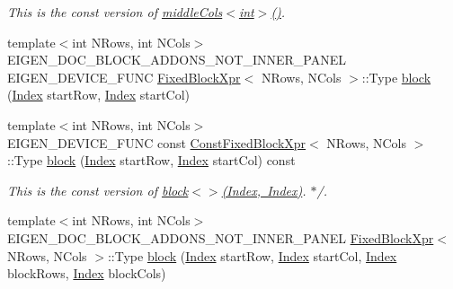 \begin{DoxyCompactItemize}
\begin{DoxyCompactList}\small\item\em This is the const version of \mbox{\hyperlink{class_eigen_1_1_sparse_matrix_base_a8a36ee6b1a072f07bfaaffd69cf31dbd}{middle\+Cols$<$int$>$()}}. \end{DoxyCompactList}\item 
{\footnotesize template$<$int N\+Rows, int N\+Cols$>$ }\\E\+I\+G\+E\+N\+\_\+\+D\+O\+C\+\_\+\+B\+L\+O\+C\+K\+\_\+\+A\+D\+D\+O\+N\+S\+\_\+\+N\+O\+T\+\_\+\+I\+N\+N\+E\+R\+\_\+\+P\+A\+N\+EL E\+I\+G\+E\+N\+\_\+\+D\+E\+V\+I\+C\+E\+\_\+\+F\+U\+NC \mbox{\hyperlink{struct_eigen_1_1_sparse_matrix_base_1_1_fixed_block_xpr}{Fixed\+Block\+Xpr}}$<$ N\+Rows, N\+Cols $>$\+::Type \mbox{\hyperlink{class_eigen_1_1_sparse_matrix_base_ad7a342adc59c2866c323ace6d2f65378}{block}} (\mbox{\hyperlink{struct_eigen_1_1_eigen_base_a554f30542cc2316add4b1ea0a492ff02}{Index}} start\+Row, \mbox{\hyperlink{struct_eigen_1_1_eigen_base_a554f30542cc2316add4b1ea0a492ff02}{Index}} start\+Col)
\item 
\mbox{\label{class_eigen_1_1_sparse_matrix_base_aba087af967b57fe36d38ba5029274630}} 
{\footnotesize template$<$int N\+Rows, int N\+Cols$>$ }\\E\+I\+G\+E\+N\+\_\+\+D\+E\+V\+I\+C\+E\+\_\+\+F\+U\+NC const \mbox{\hyperlink{struct_eigen_1_1_sparse_matrix_base_1_1_const_fixed_block_xpr}{Const\+Fixed\+Block\+Xpr}}$<$ N\+Rows, N\+Cols $>$\+::Type \mbox{\hyperlink{class_eigen_1_1_sparse_matrix_base_aba087af967b57fe36d38ba5029274630}{block}} (\mbox{\hyperlink{struct_eigen_1_1_eigen_base_a554f30542cc2316add4b1ea0a492ff02}{Index}} start\+Row, \mbox{\hyperlink{struct_eigen_1_1_eigen_base_a554f30542cc2316add4b1ea0a492ff02}{Index}} start\+Col) const
\begin{DoxyCompactList}\small\item\em This is the const version of \mbox{\hyperlink{class_eigen_1_1_sparse_matrix_base_ad7a342adc59c2866c323ace6d2f65378}{block$<$$>$(\+Index, Index)}}. $\ast$/. \end{DoxyCompactList}\item 
{\footnotesize template$<$int N\+Rows, int N\+Cols$>$ }\\E\+I\+G\+E\+N\+\_\+\+D\+O\+C\+\_\+\+B\+L\+O\+C\+K\+\_\+\+A\+D\+D\+O\+N\+S\+\_\+\+N\+O\+T\+\_\+\+I\+N\+N\+E\+R\+\_\+\+P\+A\+N\+EL \mbox{\hyperlink{struct_eigen_1_1_sparse_matrix_base_1_1_fixed_block_xpr}{Fixed\+Block\+Xpr}}$<$ N\+Rows, N\+Cols $>$\+::Type \mbox{\hyperlink{class_eigen_1_1_sparse_matrix_base_a22a720d29fee4d4f6d3739c7596a2c25}{block}} (\mbox{\hyperlink{struct_eigen_1_1_eigen_base_a554f30542cc2316add4b1ea0a492ff02}{Index}} start\+Row, \mbox{\hyperlink{struct_eigen_1_1_eigen_base_a554f30542cc2316add4b1ea0a492ff02}{Index}} start\+Col, \mbox{\hyperlink{struct_eigen_1_1_eigen_base_a554f30542cc2316add4b1ea0a492ff02}{Index}} block\+Rows, \mbox{\hyperlink{struct_eigen_1_1_eigen_base_a554f30542cc2316add4b1ea0a492ff02}{Index}} block\+Cols)

\end{DoxyCompactItemize}
